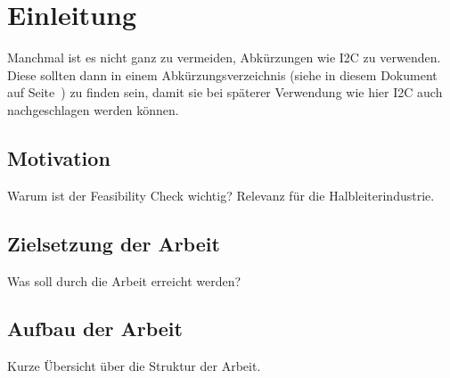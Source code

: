 \chapter{Einleitung}

Manchmal ist es nicht ganz zu vermeiden, Abkürzungen wie \ac{I2C} zu verwenden. 
Diese sollten dann in einem Abkürzungsverzeichnis (siehe in diesem Dokument auf Seite~\pageref{Sec:Abkuerzungen}) zu finden sein, damit sie bei späterer Verwendung wie hier \ac{I2C} auch nachgeschlagen werden können.

\section{Motivation}
Warum ist der Feasibility Check wichtig? Relevanz für die Halbleiterindustrie.
\section{Zielsetzung der Arbeit}
Was soll durch die Arbeit erreicht werden?
\section{Aufbau der Arbeit}
Kurze Übersicht über die Struktur der Arbeit.